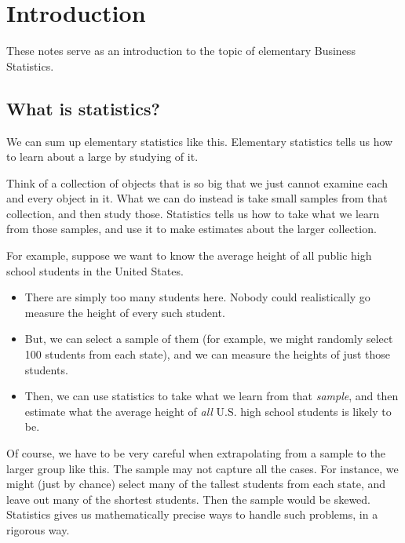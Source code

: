 \documentclass[../../main.tex]{subfiles}
\begin{document}
\chapter{Introduction}


These notes serve as an introduction to the topic of elementary Business Statistics. 


\section{What is statistics?}

We can sum up elementary statistics like this. Elementary statistics tells us how to learn about a large  by studying  of it. 

Think of a collection of objects that is so big that we just cannot examine each and every object in it. What we can do instead is take small samples from that collection, and then study those. Statistics tells us how to take what we learn from those samples, and use it to make estimates about the larger collection.

For example, suppose we want to know the average height of all public high school students in the United States. 

\begin{itemize}

  \item There are simply too many students here. Nobody could realistically go measure the height of every such student.
  
  \item But, we can select a sample of them (for example, we might randomly select 100 students from each state), and we can measure the heights of just those students. 
  
  \item Then, we can use statistics to take what we learn from that \emph{sample}, and then estimate what the average height of \emph{all} U.S. high school students is likely to be.

\end{itemize}

Of course, we have to be very careful when extrapolating from a sample to the larger group like this. The sample may not capture all the cases. For instance, we might (just by chance) select many of the tallest students from each state, and leave out many of the shortest students. Then the sample would be skewed. Statistics gives us mathematically precise ways to handle such problems, in a rigorous way.
\end{document}
